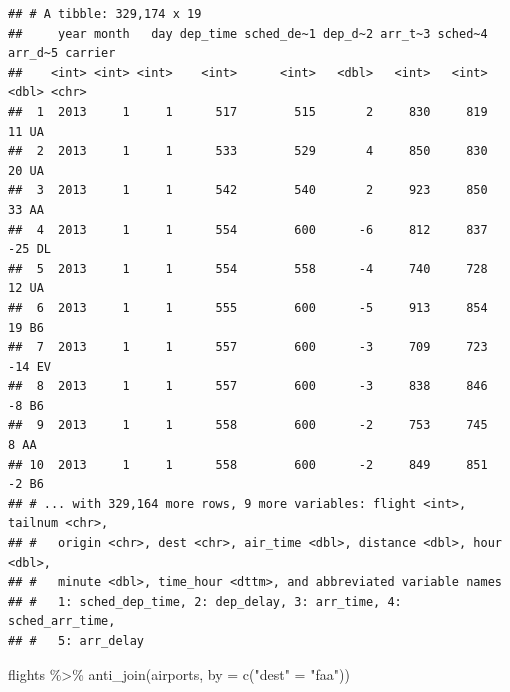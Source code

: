 \documentclass[
]{article}
\newenvironment{Shaded}{\begin{snugshade}}{\end{snugshade}}
\newcommand{\AttributeTok}[1]{\textcolor[rgb]{0.77,0.63,0.00}{#1}}
\newcommand{\FunctionTok}[1]{\textcolor[rgb]{0.00,0.00,0.00}{#1}}
\newcommand{\NormalTok}[1]{#1}
\newcommand{\OtherTok}[1]{\textcolor[rgb]{0.56,0.35,0.01}{#1}}
\newcommand{\SpecialCharTok}[1]{\textcolor[rgb]{0.00,0.00,0.00}{#1}}
\newcommand{\StringTok}[1]{\textcolor[rgb]{0.31,0.60,0.02}{#1}}
\begin{document}
\begin{verbatim}
## # A tibble: 329,174 x 19
##     year month   day dep_time sched_de~1 dep_d~2 arr_t~3 sched~4 arr_d~5 carrier
##    <int> <int> <int>    <int>      <int>   <dbl>   <int>   <int>   <dbl> <chr>  
##  1  2013     1     1      517        515       2     830     819      11 UA     
##  2  2013     1     1      533        529       4     850     830      20 UA     
##  3  2013     1     1      542        540       2     923     850      33 AA     
##  4  2013     1     1      554        600      -6     812     837     -25 DL     
##  5  2013     1     1      554        558      -4     740     728      12 UA     
##  6  2013     1     1      555        600      -5     913     854      19 B6     
##  7  2013     1     1      557        600      -3     709     723     -14 EV     
##  8  2013     1     1      557        600      -3     838     846      -8 B6     
##  9  2013     1     1      558        600      -2     753     745       8 AA     
## 10  2013     1     1      558        600      -2     849     851      -2 B6     
## # ... with 329,164 more rows, 9 more variables: flight <int>, tailnum <chr>,
## #   origin <chr>, dest <chr>, air_time <dbl>, distance <dbl>, hour <dbl>,
## #   minute <dbl>, time_hour <dttm>, and abbreviated variable names
## #   1: sched_dep_time, 2: dep_delay, 3: arr_time, 4: sched_arr_time,
## #   5: arr_delay
\end{verbatim}

\begin{Shaded}
\begin{Highlighting}[]
\NormalTok{flights }\SpecialCharTok{\%\textgreater{}\%}
  \FunctionTok{anti\_join}\NormalTok{(airports, }\AttributeTok{by =} \FunctionTok{c}\NormalTok{(}\StringTok{"dest"} \OtherTok{=} \StringTok{"faa"}\NormalTok{))}
\end{Highlighting}
\end{Shaded}
\end{document}

